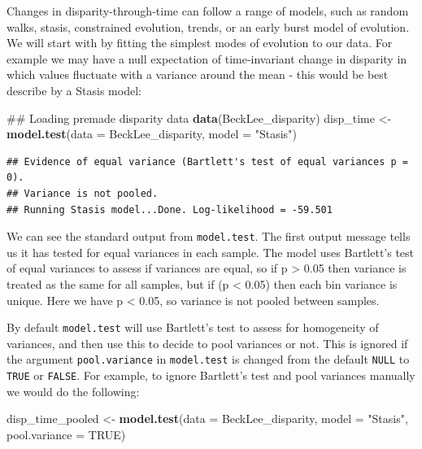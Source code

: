 \documentclass[]{book}
\newenvironment{Shaded}{\begin{snugshade}}{\end{snugshade}}
\newcommand{\KeywordTok}[1]{\textcolor[rgb]{0.13,0.29,0.53}{\textbf{#1}}}
\newcommand{\DataTypeTok}[1]{\textcolor[rgb]{0.13,0.29,0.53}{#1}}
\newcommand{\StringTok}[1]{\textcolor[rgb]{0.31,0.60,0.02}{#1}}
\newcommand{\OtherTok}[1]{\textcolor[rgb]{0.56,0.35,0.01}{#1}}
\newcommand{\NormalTok}[1]{#1}
\theoremstyle{definition}
\theoremstyle{definition}
\theoremstyle{definition}
\theoremstyle{remark}
\begin{document}
Changes in disparity-through-time can follow a range of models, such as
random walks, stasis, constrained evolution, trends, or an early burst
model of evolution. We will start with by fitting the simplest modes of
evolution to our data. For example we may have a null expectation of
time-invariant change in disparity in which values fluctuate with a
variance around the mean - this would be best describe by a Stasis
model:

\begin{Shaded}
\begin{Highlighting}[]
\NormalTok{## Loading premade disparity data}
\KeywordTok{data}\NormalTok{(BeckLee_disparity)}
\NormalTok{disp_time <-}\StringTok{ }\KeywordTok{model.test}\NormalTok{(}\DataTypeTok{data =}\NormalTok{ BeckLee_disparity, }\DataTypeTok{model =} \StringTok{"Stasis"}\NormalTok{)}
\end{Highlighting}
\end{Shaded}

\begin{verbatim}
## Evidence of equal variance (Bartlett's test of equal variances p = 0).
## Variance is not pooled.
## Running Stasis model...Done. Log-likelihood = -59.501
\end{verbatim}

We can see the standard output from \texttt{model.test}. The first
output message tells us it has tested for equal variances in each
sample. The model uses Bartlett's test of equal variances to assess if
variances are equal, so if p \textgreater{} 0.05 then variance is
treated as the same for all samples, but if (p \textless{} 0.05) then
each bin variance is unique. Here we have p \textless{} 0.05, so
variance is not pooled between samples.

By default \texttt{model.test} will use Bartlett's test to assess for
homogeneity of variances, and then use this to decide to pool variances
or not. This is ignored if the argument \texttt{pool.variance} in
\texttt{model.test} is changed from the default \texttt{NULL} to
\texttt{TRUE} or \texttt{FALSE}. For example, to ignore Bartlett's test
and pool variances manually we would do the following:

\begin{Shaded}
\begin{Highlighting}[]
\NormalTok{disp_time_pooled <-}\StringTok{ }\KeywordTok{model.test}\NormalTok{(}\DataTypeTok{data =}\NormalTok{ BeckLee_disparity, }\DataTypeTok{model =} \StringTok{"Stasis"}\NormalTok{, }\DataTypeTok{pool.variance =} \OtherTok{TRUE}\NormalTok{)}
\end{Highlighting}
\end{Shaded}
\end{document}
